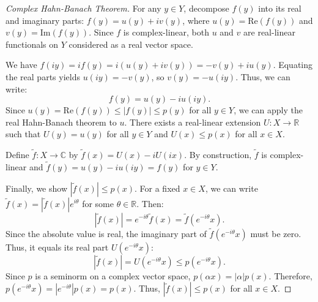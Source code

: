 \documentclass{article}
\begin{document}
\begin{proof}[Complex Hahn-Banach Theorem]
    For any $y \in Y$, decompose $f(y)$ into its real and imaginary parts: $f(y) = u(y) + iv(y)$, where $u(y) = \text{Re}(f(y))$ and $v(y) = \text{Im}(f(y))$. Since $f$ is complex-linear, both $u$ and $v$ are real-linear functionals on $Y$ considered as a real vector space.

    We have $f(iy) = if(y) = i(u(y) + iv(y)) = -v(y) + iu(y)$.
    Equating the real parts yields $u(iy) = -v(y)$, so $v(y) = -u(iy)$. Thus, we can write:
    \[ f(y) = u(y) - iu(iy). \]
    Since $u(y) = \text{Re}(f(y)) \le |f(y)| \le p(y)$ for all $y \in Y$, we can apply the real Hahn-Banach theorem to $u$. There exists a real-linear extension $U: X \to \mathbb{R}$ such that $U(y) = u(y)$ for all $y \in Y$ and $U(x) \le p(x)$ for all $x \in X$.

    Define $\tilde{f}: X \to \mathbb{C}$ by $\tilde{f}(x) = U(x) - iU(ix)$.
    By construction, $\tilde{f}$ is complex-linear and $\tilde{f}(y) = u(y) - iu(iy) = f(y)$ for $y \in Y$.

    Finally, we show $|\tilde{f}(x)| \le p(x)$. For a fixed $x \in X$, we can write $\tilde{f}(x) = |\tilde{f}(x)| e^{i\theta}$ for some $\theta \in \mathbb{R}$. Then:
    \[ |\tilde{f}(x)| = e^{-i\theta} \tilde{f}(x) = \tilde{f}(e^{-i\theta}x). \]
    Since the absolute value is real, the imaginary part of $\tilde{f}(e^{-i\theta}x)$ must be zero. Thus, it equals its real part $U(e^{-i\theta}x)$:
    \[ |\tilde{f}(x)| = U(e^{-i\theta}x) \le p(e^{-i\theta}x). \]
    Since $p$ is a seminorm on a complex vector space, $p(\alpha x) = |\alpha| p(x)$. Therefore, $p(e^{-i\theta}x) = |e^{-i\theta}| p(x) = p(x)$. Thus, $|\tilde{f}(x)| \le p(x)$ for all $x \in X$.
\end{proof}

\vspace{0.5cm}
\end{document}
